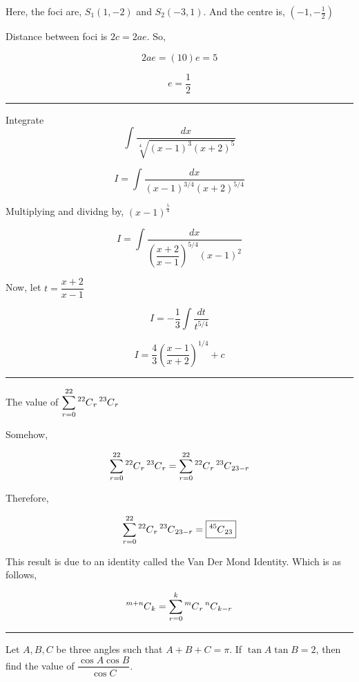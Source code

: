 \documentclass[twocolumn]{article}
\newcommand\Mycomb[2]{\prescript{#1\mkern-0.5mu}{}C_{#2}}
\begin{document}
\begin{CJK*}{UTF8}{gbsn}
\vspace*{0.1in}

Here, the foci are, \(S_1 (1, -2)\) and \(S_2 (-3, 1)\). And the centre is, \((-1,-\frac{1}{2})\) 

\vspace*{0.1in}

Distance between foci is \(2c = 2ae\). So, 

\[
    2ae = (10)e =  5
\]

\[
    e = \frac{1}{2}
\]

\hrule 

\begin{question}
    Integrate 
    \[
        \int \frac{dx}{\sqrt[4]{(x-1)^3 (x+2)^5} }
    \]
\end{question}

\[
    I = \int \frac{dx}{(x-1)^{3/4} (x+2)^{5/4} }
\]

Multiplying and dividng by, \((x-1)^\frac{5}{4}\)

\[
    I = \int \frac{dx}{(\dfrac{x+2}{x-1})^{5/4} (x-1)^{2} }
\]

Now, let \(t = \dfrac{x+2}{x-1}\) 

\[
    I = -\frac{1}{3}\int \frac{dt}{t^{5/4} }
\]

\[
    \boxed{I = \frac{4}{3} (\frac{x-1}{x+2})^{1/4} + c }
\]

\hrule 

\begin{question}
    The value of \(\displaystyle \sum_{r = 0}^{22} \Mycomb{22}{r} \Mycomb{23}{r} \) 
\end{question}

Somehow, 

\[
    \sum_{r=0}^{22} \Mycomb{22}{r} \Mycomb{23}{r} = \sum_{r=0} ^{22} \Mycomb{22}{r} \Mycomb{23}{23-r} 
\]

Therefore, 

\[
    \sum_{r=0} ^{22} \Mycomb{22}{r} \Mycomb{23}{23-r} = \boxed{\Mycomb{45}{23}}
\]

This result is due to an identity called the Van Der Mond Identity. Which is as follows, 

\[
    \Mycomb{m+n}{k} = \sum_{r=0} ^{k} \Mycomb{m}{r} \Mycomb{n}{k-r}  
\]

\vspace{0.1in}

\hrule

\begin{question}
    Let \(A, B, C\) be three angles such that \(A + B + C = \pi\). If \(\tan A \tan B = 2\), then find the value of \(\dfrac{\cos A \cos B}{\cos C}\).   
\end{question}


\end{CJK*}
\end{document}
